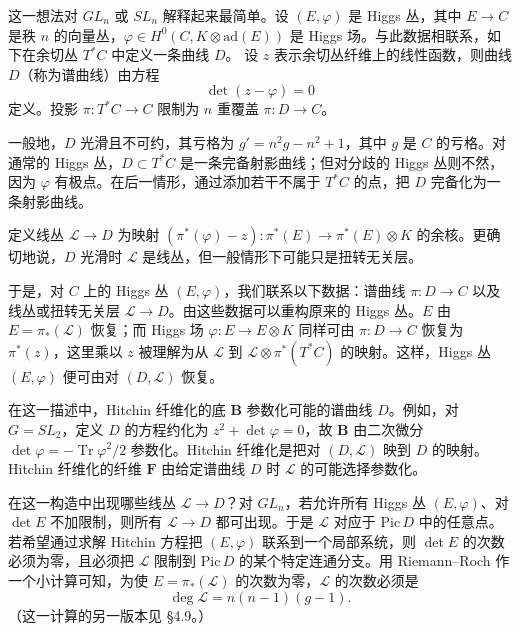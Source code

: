 \documentclass[11pt,a4paper]{article}
\newcommand{\Tr}{\operatorname{Tr}}
\begin{document}
这一想法对 $GL_n$ 或 $SL_n$ 解释起来最简单。设 $(E,\varphi)$ 是 Higgs 丛，其中 $E\to C$ 是秩 $n$ 的向量丛，$\varphi\in H^0(C,K\otimes\mathrm{ad}(E))$ 是 Higgs 场。与此数据相联系，如下在余切丛 $T^*C$ 中定义一条曲线 $D$。
设 $z$ 表示余切丛纤维上的线性函数，则曲线 $D$（称为谱曲线）由方程
\begin{equation}\tag{4.1}
\det(z-\varphi)=0
\end{equation}
定义。投影 $\pi:T^*C\to C$ 限制为 $n$ 重覆盖 $\pi:D\to C$。

一般地，$D$ 光滑且不可约，其亏格为 $g'=n^2g-n^2+1$，其中 $g$ 是 $C$ 的亏格。对通常的 Higgs 丛，$D\subset T^*C$ 是一条完备射影曲线；但对分歧的 Higgs 丛则不然，因为 $\varphi$ 有极点。在后一情形，通过添加若干不属于 $T^*C$ 的点，把 $D$ 完备化为一条射影曲线。


定义线丛 $\mathcal{L}\to D$ 为映射 $(\pi^*(\varphi)-z):\pi^*(E)\to\pi^*(E)\otimes K$ 的余核。更确切地说，$D$ 光滑时 $\mathcal{L}$ 是线丛，但一般情形下可能只是扭转无关层。

于是，对 $C$ 上的 Higgs 丛 $(E,\varphi)$，我们联系以下数据：谱曲线 $\pi:D\to C$ 以及线丛或扭转无关层 $\mathcal{L}\to D$。由这些数据可以重构原来的 Higgs 丛。$E$ 由 $E=\pi_*(\mathcal{L})$ 恢复；而 Higgs 场 $\varphi:E\to E\otimes K$ 同样可由 $\pi:D\to C$ 恢复为 $\pi^*(z)$，这里乘以 $z$ 被理解为从 $\mathcal{L}$ 到 $\mathcal{L}\otimes\pi^*(T^*C)$ 的映射。这样，Higgs 丛 $(E,\varphi)$ 便可由对 $(D,\mathcal{L})$ 恢复。

在这一描述中，Hitchin 纤维化的底 $\boldsymbol{B}$ 参数化可能的谱曲线 $D$。例如，对 $G=SL_2$，定义 $D$ 的方程约化为 $z^2+\det\varphi=0$，故 $\boldsymbol{B}$ 由二次微分 $\det\varphi=-\Tr\varphi^2/2$ 参数化。Hitchin 纤维化是把对 $(D,\mathcal{L})$ 映到 $D$ 的映射。Hitchin 纤维化的纤维 $\boldsymbol{F}$ 由给定谱曲线 $D$ 时 $\mathcal{L}$ 的可能选择参数化。

在这一构造中出现哪些线丛 $\mathcal{L}\to D$？对 $GL_n$，若允许所有 Higgs 丛 $(E,\varphi)$、对 $\det E$ 不加限制，则所有 $\mathcal{L}\to D$ 都可出现。于是 $\mathcal{L}$ 对应于 $\mathrm{Pic}\,D$ 中的任意点。若希望通过求解 Hitchin 方程把 $(E,\varphi)$ 联系到一个局部系统，则 $\det E$ 的次数必须为零，且必须把 $\mathcal{L}$ 限制到 $\mathrm{Pic}\,D$ 的某个特定连通分支。用 Riemann--Roch 作一个小计算可知，为使 $E=\pi_*(\mathcal{L})$ 的次数为零，$\mathcal{L}$ 的次数必须是
\begin{equation}\tag{4.2}
\deg\mathcal{L}=n(n-1)(g-1).
\end{equation}
（这一计算的另一版本见 §4.9。）
\end{document}
